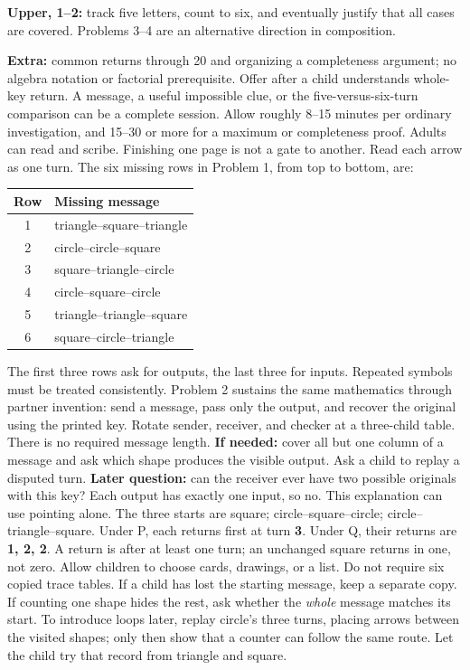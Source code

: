 \documentclass[11pt]{article}
\begin{document}
\textbf{Upper, 1--2:} track five letters, count to six, and eventually justify that all cases are covered. Problems 3--4 are an alternative direction in composition.\par
\textbf{Extra:} common returns through 20 and organizing a completeness argument; no algebra notation or factorial prerequisite. Offer after a child understands whole-key return.
A message, a useful impossible clue, or the five-versus-six-turn comparison can be a complete session. Allow roughly 8--15 minutes per ordinary investigation, and 15--30 or more for a maximum or completeness proof. Adults can read and scribe. Finishing one page is not a gate to another.
\newpage
{}
Read each arrow as one turn. The six missing rows in Problem 1, from top to bottom, are:
\begin{center}\renewcommand{\arraystretch}{1.45}\begin{tabular}{c|l}Row&Missing message\\\hline1&triangle--square--triangle\\2&circle--circle--square\\3&square--triangle--circle\\4&circle--square--circle\\5&triangle--triangle--square\\6&square--circle--triangle\end{tabular}\end{center}
The first three rows ask for outputs, the last three for inputs. Repeated symbols must be treated consistently. Problem 2 sustains the same mathematics through partner invention: send a message, pass only the output, and recover the original using the printed key. Rotate sender, receiver, and checker at a three-child table. There is no required message length.
\textbf{If needed:} cover all but one column of a message and ask which shape produces the visible output. Ask a child to replay a disputed turn. \textbf{Later question:} can the receiver ever have two possible originals with this key? Each output has exactly one input, so no. This explanation can use pointing alone.
The three starts are square; circle--square--circle; circle--triangle--square. Under P, each returns first at turn \textbf{3}. Under Q, their returns are \textbf{1, 2, 2}. A return is after at least one turn; an unchanged square returns in one, not zero.
Allow children to choose cards, drawings, or a list. Do not require six copied trace tables. If a child has lost the starting message, keep a separate copy. If counting one shape hides the rest, ask whether the \emph{whole} message matches its start. To introduce loops later, replay circle's three turns, placing arrows between the visited shapes; only then show that a counter can follow the same route. Let the child try that record from triangle and square.
\end{document}
